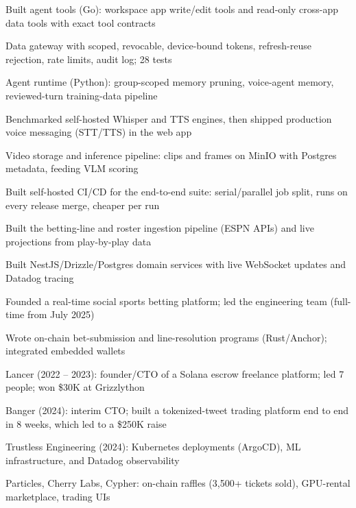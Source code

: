 \documentclass[print]{jack-resume}
\begin{document}
\begin{tightemize}
    \item Built agent tools (Go): workspace app write/edit tools and read-only cross-app data tools with exact tool contracts
    \item Data gateway with scoped, revocable, device-bound tokens, refresh-reuse rejection, rate limits, audit log; 28 tests
    \item Agent runtime (Python): group-scoped memory pruning, voice-agent memory, reviewed-turn training-data pipeline
    \item Benchmarked self-hosted Whisper and TTS engines, then shipped production voice messaging (STT/TTS) in the web app
    \item Video storage and inference pipeline: clips and frames on MinIO with Postgres metadata, feeding VLM scoring
    \item Built self-hosted CI/CD for the end-to-end suite: serial/parallel job split, runs on every release merge, cheaper per run
\end{tightemize}
\sectionsep

\begin{tightemize}
    \item Built the betting-line and roster ingestion pipeline (ESPN APIs) and live projections from play-by-play data
    \item Built NestJS/Drizzle/Postgres domain services with live WebSocket updates and Datadog tracing
    \item Founded a real-time social sports betting platform; led the engineering team (full-time from July 2025)
    \item Wrote on-chain bet-submission and line-resolution programs (Rust/Anchor); integrated embedded wallets
\end{tightemize}
\sectionsep

\begin{tightemize}
    \item Lancer (2022 – 2023): founder/CTO of a Solana escrow freelance platform; led 7 people; won \$30K at Grizzlython
    \item Banger (2024): interim CTO; built a tokenized-tweet trading platform end to end in 8 weeks, which led to a \$250K raise
    \item Trustless Engineering (2024): Kubernetes deployments (ArgoCD), ML infrastructure, and Datadog observability
    \item Particles, Cherry Labs, Cypher: on-chain raffles (3,500+ tickets sold), GPU-rental marketplace, trading UIs
\end{tightemize}
\sectionsep
\end{document}
